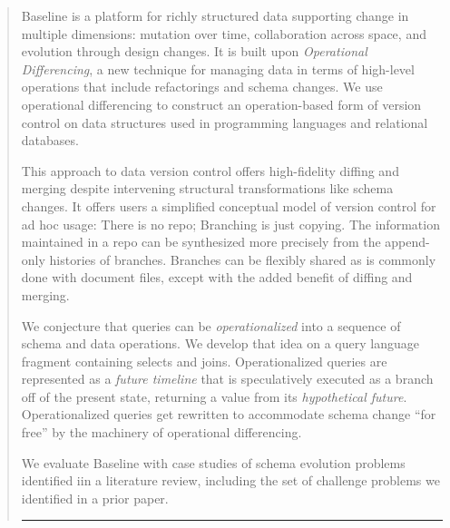 \documentclass[english,submission]{programming}
\theoremstyle{definition}
\begin{document}
\maketitle

\begin{abstract}

  Baseline is a platform for richly structured data supporting change in multiple dimensions: mutation over time, collaboration across space, and evolution through design changes. It is built upon \textit{Operational Differencing}, a new technique for managing data in terms of high-level operations that include refactorings and schema changes. We use operational differencing to construct an operation-based form of version control on data structures used in programming languages and relational databases.

  This approach to data version control offers high-fidelity diffing and merging despite intervening structural transformations like schema changes. It offers users a simplified conceptual model of version control for ad hoc usage: There is no repo; Branching is just copying. The information maintained in a repo can be synthesized more precisely from the append-only histories of branches. Branches can be flexibly shared as is commonly done with document files, except with the added benefit of diffing and merging.

  We conjecture that queries can be \textit{operationalized} into a sequence of schema and data operations. We develop that idea on a query language fragment containing selects and joins.
  Operationalized queries are represented as a \textit{future timeline} that is speculatively executed as a branch off of the present state, returning a value from its \textit{hypothetical future}. Operationalized queries get rewritten to accommodate schema change ``for free'' by the machinery of operational differencing.


  We evaluate Baseline with case studies of schema evolution problems identified iin a literature review, including the set of challenge problems we identified in a prior paper.



\noindent\rule{\textwidth}{1pt}


\end{abstract}
\end{document}
